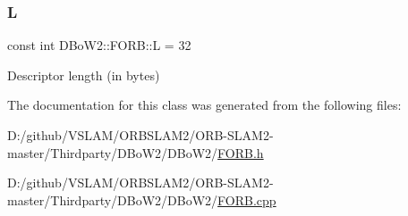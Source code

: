 \subsubsection{\texorpdfstring{L}{L}}
{\footnotesize\ttfamily const int D\+Bo\+W2\+::\+F\+O\+R\+B\+::L = 32\hspace{0.3cm}{\ttfamily [static]}}



Descriptor length (in bytes) 



The documentation for this class was generated from the following files\+:\begin{DoxyCompactItemize}
\item 
D\+:/github/\+V\+S\+L\+A\+M/\+O\+R\+B\+S\+L\+A\+M2/\+O\+R\+B-\/\+S\+L\+A\+M2-\/master/\+Thirdparty/\+D\+Bo\+W2/\+D\+Bo\+W2/\mbox{\hyperlink{_f_o_r_b_8h}{F\+O\+R\+B.\+h}}\item 
D\+:/github/\+V\+S\+L\+A\+M/\+O\+R\+B\+S\+L\+A\+M2/\+O\+R\+B-\/\+S\+L\+A\+M2-\/master/\+Thirdparty/\+D\+Bo\+W2/\+D\+Bo\+W2/\mbox{\hyperlink{_f_o_r_b_8cpp}{F\+O\+R\+B.\+cpp}}\end{DoxyCompactItemize}
